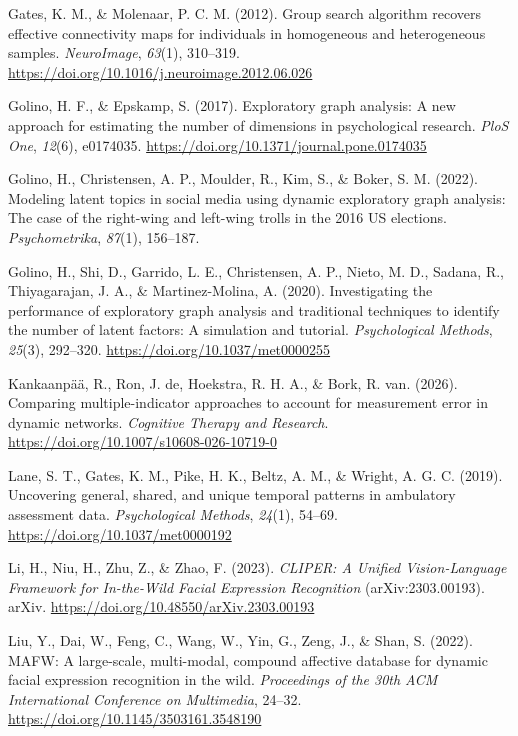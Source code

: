 \documentclass[
]{article}
\newlength{\cslhangindent}
\newenvironment{CSLReferences}[2] %
 {\begin{list}{}{%
  \setlength{\itemindent}{0pt}
  \setlength{\leftmargin}{0pt}
  \setlength{\parsep}{0pt}
  \ifodd #1
   \setlength{\leftmargin}{\cslhangindent}
   \setlength{\itemindent}{-1\cslhangindent}
  \fi
  \setlength{\itemsep}{#2\baselineskip}}}
 {\end{list}}
\begin{document}
\begin{CSLReferences}{1}{0}
Gates, K. M., \& Molenaar, P. C. M. (2012). Group search algorithm
recovers effective connectivity maps for individuals in homogeneous and
heterogeneous samples. \emph{NeuroImage}, \emph{63}(1), 310--319.
\url{https://doi.org/10.1016/j.neuroimage.2012.06.026}

Golino, H. F., \& Epskamp, S. (2017). Exploratory graph analysis: A new
approach for estimating the number of dimensions in psychological
research. \emph{PloS One}, \emph{12}(6), e0174035.
\url{https://doi.org/10.1371/journal.pone.0174035}

Golino, H., Christensen, A. P., Moulder, R., Kim, S., \& Boker, S. M.
(2022). Modeling latent topics in social media using dynamic exploratory
graph analysis: The case of the right-wing and left-wing trolls in the
2016 US elections. \emph{Psychometrika}, \emph{87}(1), 156--187.

Golino, H., Shi, D., Garrido, L. E., Christensen, A. P., Nieto, M. D.,
Sadana, R., Thiyagarajan, J. A., \& Martinez-Molina, A. (2020).
Investigating the performance of exploratory graph analysis and
traditional techniques to identify the number of latent factors: A
simulation and tutorial. \emph{Psychological Methods}, \emph{25}(3),
292--320. \url{https://doi.org/10.1037/met0000255}

Kankaanpää, R., Ron, J. de, Hoekstra, R. H. A., \& Bork, R. van. (2026).
Comparing multiple-indicator approaches to account for measurement error
in dynamic networks. \emph{Cognitive Therapy and Research}.
\url{https://doi.org/10.1007/s10608-026-10719-0}

Lane, S. T., Gates, K. M., Pike, H. K., Beltz, A. M., \& Wright, A. G.
C. (2019). Uncovering general, shared, and unique temporal patterns in
ambulatory assessment data. \emph{Psychological Methods}, \emph{24}(1),
54--69. \url{https://doi.org/10.1037/met0000192}

Li, H., Niu, H., Zhu, Z., \& Zhao, F. (2023). \emph{{CLIPER}: {A Unified
Vision-Language Framework} for {In-the-Wild Facial Expression
Recognition}} (arXiv:2303.00193). {arXiv}.
\url{https://doi.org/10.48550/arXiv.2303.00193}

Liu, Y., Dai, W., Feng, C., Wang, W., Yin, G., Zeng, J., \& Shan, S.
(2022). {MAFW}: A large-scale, multi-modal, compound affective database
for dynamic facial expression recognition in the wild. \emph{Proceedings
of the 30th ACM International Conference on Multimedia}, 24--32.
\url{https://doi.org/10.1145/3503161.3548190}


\end{CSLReferences}
\end{document}
